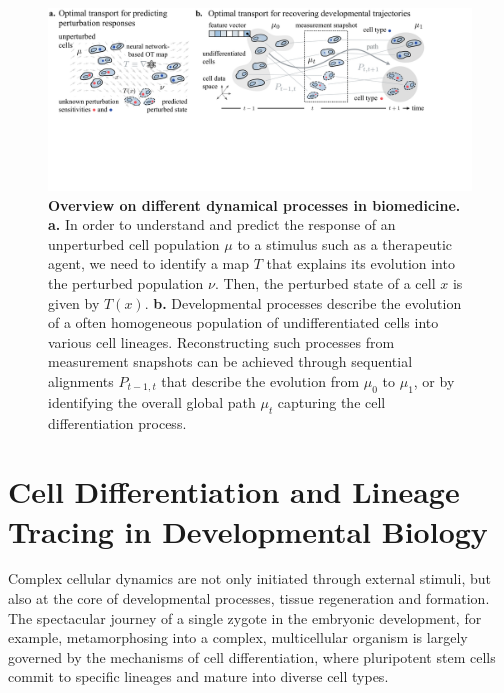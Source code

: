 \begin{figure}[t]
  \includegraphics[width=\textwidth]{figures/fig_bio_problems.pdf}
  \caption{\textbf{Overview on different dynamical processes in biomedicine.} \textbf{a.} In order to understand and predict the response of an unperturbed cell population $\mu$ to a stimulus such as a therapeutic agent, we need to identify a map $T$ that explains its evolution into the perturbed population $\nu$. Then, the perturbed state of a cell $x$ is given by $T(x)$.  \textbf{b.} Developmental processes describe the evolution of a often homogeneous population of undifferentiated cells into various cell lineages. Reconstructing such processes from measurement snapshots can be achieved through sequential alignments $P_{t-1,t}$ that describe the evolution from $\mu_0$ to $\mu_1$, or by identifying the overall global path $\mu_t$ capturing the cell differentiation process.}
  \label{fig:bio_problems}
\end{figure}

\section{Cell Differentiation and Lineage Tracing in Developmental Biology}
\label{sec:cell_differentiation}

Complex cellular dynamics are not only initiated through external stimuli, but also at the core of developmental processes, tissue regeneration and formation.
The spectacular journey of a single zygote in the embryonic development, for example, metamorphosing into a complex, multicellular organism is largely governed by the mechanisms of cell differentiation, where pluripotent stem cells commit to specific lineages and mature into diverse cell types.

